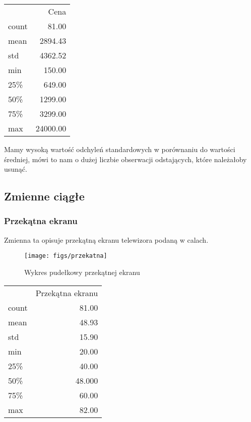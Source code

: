 \documentclass[11pt,a4paper]{article}
\begin{document}
		\begin{center}
			\begin{tabular}{lr}
				 
				{} &          Cena \\
				 
				count &     81.00 \\
				mean  &   2894.43 \\
				std   &   4362.52 \\
				min   &    150.00 \\
				25\%   &    649.00 \\
				50\%   &   1299.00 \\
				75\%   &   3299.00 \\
				max   &  24000.00 \\
				 
			\end{tabular}
		\end{center}
		Mamy wysoką wartość odchyleń standardowych w porównaniu do wartości średniej, mówi to nam o dużej liczbie obserwacji odstających, które należałoby usunąć. 
	
	\subsection{Zmienne ciągłe}
	
		\subsubsection{Przekątna ekranu}
			Zmienna ta opisuje przekątną ekranu telewizora podaną w calach.
			\begin{figure}[h]
				\centering
				\texttt{[image: figs/przekatna]}
				\caption[Przekątna]{Wykres pudełkowy przekątnej ekranu}
				\label{fig:Przekątna}
			\end{figure}
		
			\begin{center}
				\begin{tabular}{lr}
					 
					{} &  Przekątna ekranu \\
					 
					count &         81.00 \\
					mean  &         48.93 \\
					std   &         15.90 \\
					min   &         20.00 \\
					25\%   &         40.00 \\
					50\%   &         48.000 \\
					75\%   &         60.00 \\
					max   &         82.00 \\
					 
				\end{tabular}
			\end{center}
			
\end{document}
